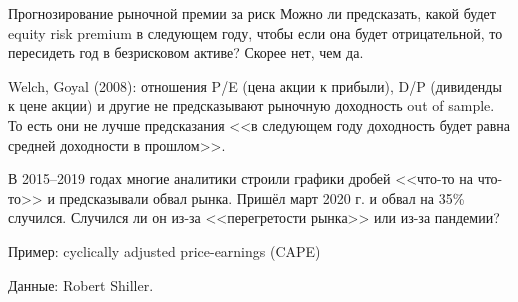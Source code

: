 \documentclass{beamer}
\begin{document}
\begin{frame}{Прогнозирование рыночной премии за риск}
\justify
Можно ли предсказать, какой будет equity risk premium в следующем году, чтобы если она будет отрицательной, то пересидеть год в безрисковом активе? Скорее нет, чем да.

\justify
Welch, Goyal (2008): отношения P/E (цена акции к прибыли), D/P (дивиденды к цене акции) и другие не предсказывают рыночную доходность out of sample. То есть они не лучше предсказания <<в следующем году доходность будет равна средней доходности в прошлом>>.

\justify
В 2015--2019 годах многие аналитики строили графики дробей <<что-то на что-то>> и предсказывали обвал рынка. Пришёл март 2020 г. и обвал на 35\% случился. Случился ли он из-за <<перегретости рынка>> или из-за пандемии?
\end{frame}




\begin{frame}{Пример: cyclically adjusted price-earnings (CAPE)}
\centering
{}
{\scriptsize Данные: Robert Shiller.}
\end{frame}
\end{document}
